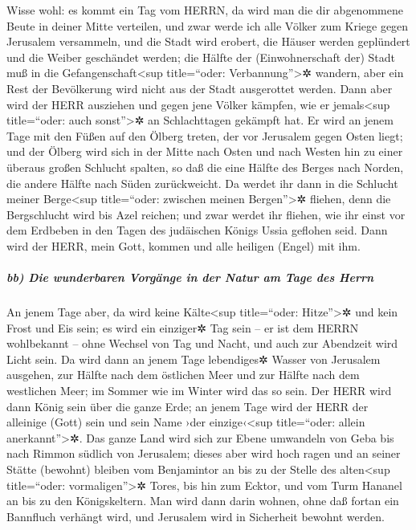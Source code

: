  Wisse wohl: es kommt ein Tag vom HERRN, da wird man die
dir abgenommene Beute in deiner Mitte verteilen,  und zwar
werde ich alle Völker zum Kriege gegen Jerusalem versammeln, und die
Stadt wird erobert, die Häuser werden geplündert und die Weiber
geschändet werden; die Hälfte der (Einwohnerschaft der) Stadt muß in die
Gefangenschaft\textless sup title=``oder: Verbannung''\textgreater✲
wandern, aber ein Rest der Bevölkerung wird nicht aus der Stadt
ausgerottet werden.  Dann aber wird der HERR ausziehen und
gegen jene Völker kämpfen, wie er jemals\textless sup title=``oder: auch
sonst''\textgreater✲ an Schlachttagen gekämpft hat.  Er
wird an jenem Tage mit den Füßen auf den Ölberg treten, der vor
Jerusalem gegen Osten liegt; und der Ölberg wird sich in der Mitte nach
Osten und nach Westen hin zu einer überaus großen Schlucht spalten, so
daß die eine Hälfte des Berges nach Norden, die andere Hälfte nach Süden
zurückweicht.  Da werdet ihr dann in die Schlucht meiner
Berge\textless sup title=``oder: zwischen meinen Bergen''\textgreater✲
fliehen, denn die Bergschlucht wird bis Azel reichen; und zwar werdet
ihr fliehen, wie ihr einst vor dem Erdbeben in den Tagen des judäischen
Königs Ussia geflohen seid. Dann wird der HERR, mein Gott, kommen und
alle heiligen (Engel) mit ihm.

\hypertarget{bb-die-wunderbaren-vorguxe4nge-in-der-natur-am-tage-des-herrn}{%
\subparagraph{bb) Die wunderbaren Vorgänge in der Natur am Tage des
Herrn}\label{bb-die-wunderbaren-vorguxe4nge-in-der-natur-am-tage-des-herrn}}

 An jenem Tage aber, da wird keine Kälte\textless sup
title=``oder: Hitze''\textgreater✲ und kein Frost und Eis sein;
 es wird ein einziger✲ Tag sein -- er ist dem HERRN
wohlbekannt -- ohne Wechsel von Tag und Nacht, und auch zur Abendzeit
wird Licht sein.  Da wird dann an jenem Tage lebendiges✲
Wasser von Jerusalem ausgehen, zur Hälfte nach dem östlichen Meer und
zur Hälfte nach dem westlichen Meer; im Sommer wie im Winter wird das so
sein.  Der HERR wird dann König sein über die ganze Erde;
an jenem Tage wird der HERR der alleinige (Gott) sein und sein Name ›der
einzige‹\textless sup title=``oder: allein anerkannt''\textgreater✲.
 Das ganze Land wird sich zur Ebene umwandeln von Geba
bis nach Rimmon südlich von Jerusalem; dieses aber wird hoch ragen und
an seiner Stätte (bewohnt) bleiben vom Benjamintor an bis zu der Stelle
des alten\textless sup title=``oder: vormaligen''\textgreater✲ Tores,
bis hin zum Ecktor, und vom Turm Hananel an bis zu den Königskeltern.
 Man wird dann darin wohnen, ohne daß fortan ein
Bannfluch verhängt wird, und Jerusalem wird in Sicherheit bewohnt
werden.

